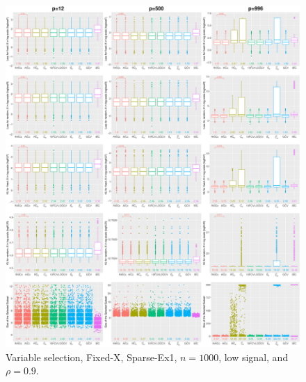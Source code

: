\begin{figure}[!ht]
\centering
\includegraphics[width=\textwidth]{figures/supplement/fixedx/subset_selection/Sparse-Ex1_n1000_lsnr_rho09.eps}
\caption{Variable selection, Fixed-X, Sparse-Ex1, $n=1000$, low signal, and $\rho=0.9$.}
\end{figure}
\clearpage
